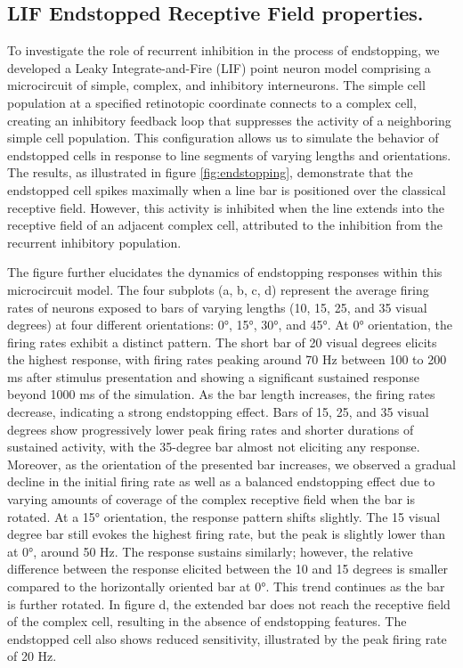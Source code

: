 \documentclass[12pt]{article}
\begin{document}
\subsection{LIF Endstopped Receptive Field properties.}
To investigate the role of recurrent inhibition in the process of endstopping, we developed a Leaky Integrate-and-Fire (LIF) point neuron model comprising a microcircuit of simple, complex, and inhibitory interneurons. The simple cell population at a specified retinotopic coordinate connects to a complex cell, creating an inhibitory feedback loop that suppresses the activity of a neighboring simple cell population. This configuration allows us to simulate the behavior of endstopped cells in response to line segments of varying lengths and orientations. The results, as illustrated in figure \ref{fig:endstopping}, demonstrate that the endstopped cell spikes maximally when a line bar is positioned over the classical receptive field. However, this activity is inhibited when the line extends into the receptive field of an adjacent complex cell, attributed to the inhibition from the recurrent inhibitory population.

The figure further elucidates the dynamics of endstopping responses within this microcircuit model. The four subplots (a, b, c, d) represent the average firing rates of neurons exposed to bars of varying lengths (10, 15, 25, and 35 visual degrees) at four different orientations: 0°, 15°, 30°, and 45°. At 0° orientation, the firing rates exhibit a distinct pattern. The short bar of 20 visual degrees elicits the highest response, with firing rates peaking around 70 Hz between 100 to 200 ms after stimulus presentation and showing a significant sustained response beyond 1000 ms of the simulation. As the bar length increases, the firing rates decrease, indicating a strong endstopping effect. Bars of 15, 25, and 35 visual degrees show progressively lower peak firing rates and shorter durations of sustained activity, with the 35-degree bar almost not eliciting any response. Moreover, as the orientation of the presented bar increases, we observed a gradual decline in the initial firing rate as well as a balanced endstopping effect due to varying amounts of coverage of the complex receptive field when the bar is rotated. At a 15° orientation, the response pattern shifts slightly. The 15 visual degree bar still evokes the highest firing rate, but the peak is slightly lower than at 0°, around 50 Hz. The response sustains similarly; however, the relative difference between the response elicited between the 10 and 15 degrees is smaller compared to the horizontally oriented bar at 0°. This trend continues as the bar is further rotated. In figure d, the extended bar does not reach the receptive field of the complex cell, resulting in the absence of endstopping features. The endstopped cell also shows reduced sensitivity, illustrated by the peak firing rate of 20 Hz.
\end{document}
